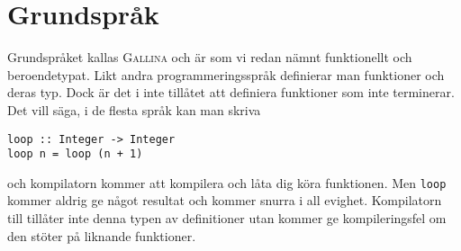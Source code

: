 \section{Grundspråk}
Grundspråket kallas \textsc{Gallina} och är som vi redan nämnt funktionellt och
beroendetypat. Likt andra programmeringsspråk definierar man funktioner och
deras typ. Dock är det i \coq{} inte tillåtet att definiera funktioner som inte
terminerar. Det vill säga, i de flesta språk kan man skriva
\begin{verbatim}
loop :: Integer -> Integer
loop n = loop (n + 1)
\end{verbatim}
och kompilatorn kommer att kompilera och låta dig köra funktionen. Men
\verb+loop+ kommer aldrig ge något resultat och kommer snurra i all evighet.
Kompilatorn till \coq{} tillåter inte denna typen av definitioner utan kommer
ge kompileringsfel om den stöter på liknande funktioner.

